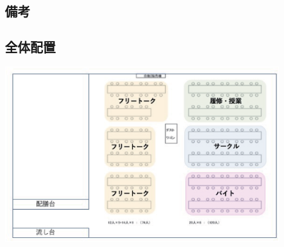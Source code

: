 \subsection{備考}
\subsection{全体配置}
\begin{center}
\includegraphics[width=12cm]{./13/hone.eps}
\end{center}


